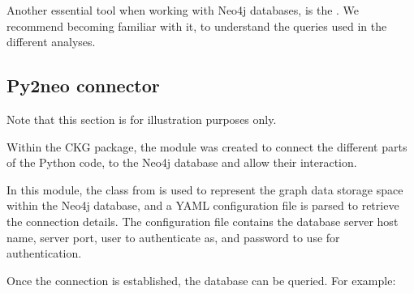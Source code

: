 \documentclass[letterpaper,10pt,english]{sphinxmanual}
\begin{document}
Another essential tool when working with Neo4j databases, is the . We recommend becoming familiar with it, to understand the queries used in the different analyses.


\subsection{Py2neo connector}
\label{\detokenize{getting_started/connect-to-ckg:py2neo-connector}}
Note that this section is for illustration purposes only.

Within the CKG package, the  module was created to connect the different parts of the Python code, to the Neo4j database and allow their interaction.

In this module, the  class from  is used to represent the graph data storage space within the Neo4j database, and a YAML configuration file is parsed to retrieve the connection details. The configuration file  contains the database server host name, server port, user to authenticate as, and password to use for authentication.

\begin{sphinxVerbatim}[commandchars=\\\{\}]
   
  
\end{sphinxVerbatim}

Once the connection is established, the database can be queried. For example:

\begin{sphinxVerbatim}[commandchars=\\\{\}]
  
    
\end{sphinxVerbatim}
\end{document}
